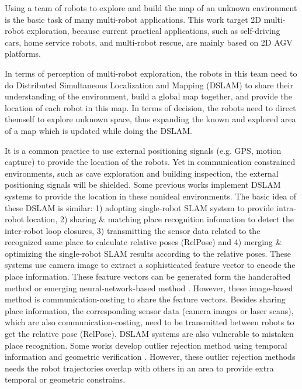 Using a team of robots to explore and build the map of an unknown environment is the basic task of many multi-robot applications.
This work target 2D multi-robot exploration, because current practical applications, such as self-driving cars, home service robots, and multi-robot rescue, are mainly based on 2D AGV platforms.

In terms of perception of multi-robot exploration, the robots in this team need to do Distributed Simultaneous Localization and Mapping (DSLAM) to share their understanding of the environment, build a global map together, and provide the location of each robot in this map.
In terms of decision, the robots need to direct themself to explore unknown space, thus expanding the known and explored area of a map which is updated while doing the DSLAM.

It is a common practice to use external positioning signals (e.g. GPS, motion capture) to provide the location of the robots. 
Yet in communication constrained environments, such as cave exploration and building inspection, the external positioning signals will be shielded. 
Some previous works implement DSLAM systems \cite{cieslewski2018data,lajoie2020door, schmuck2019ccm} to provide the location in these nonideal environments. 
The basic idea of these DSLAM is similar: 1) adopting single-robot SLAM system to provide intra-robot location, 2) sharing \& matching place recognition infomation to detect the inter-robot loop closures, 3) transmitting the sensor data related to the recognized same place to calculate relative poses (RelPose) and 4) merging \& optimizing the single-robot SLAM results according to the relative poses. 
These systems use camera image to extract a sophisticated feature vector to encode the place information. 
These feature vectors can be generated form the handcrafted method \cite{jegou2014triang} or emerging neural-network-based method \cite{radenovic2018fine, arandjelovic2016netvlad}. 
However, these image-based  method is communication-costing to share the feature vectors. 
Besides sharing place information, the corresponding sensor data (camera images or laser scans), which are also communication-costing, need to be transmitted between robots to get the relative pose (RelPose).
DSLAM systems are also vulnerable to mistaken place recognition. Some works develop outlier rejection method using temporal information \cite{cieslewski2018data} and geometric verification \cite{lajoie2020door}. 
However, these outlier rejection methods needs the robot trajectories overlap with others in an area to provide extra temporal or geometric constrains.

